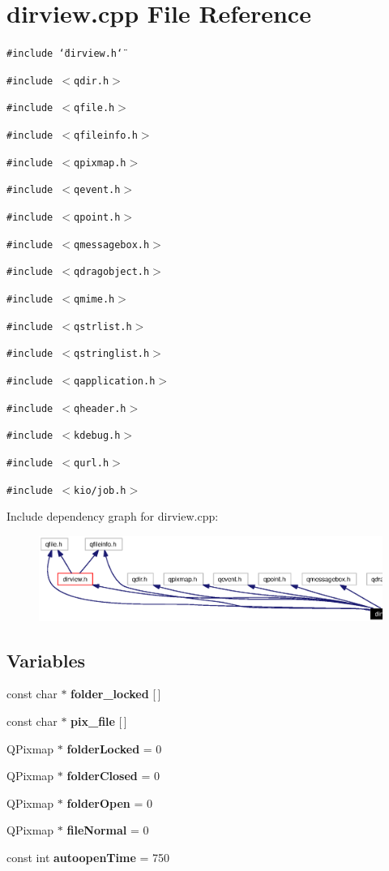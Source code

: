 \section{dirview.cpp File Reference}
\label{dirview_8cpp}


{\tt \#include \char`\"{}dirview.h\char`\"{}}\par
{\tt \#include $<$qdir.h$>$}\par
{\tt \#include $<$qfile.h$>$}\par
{\tt \#include $<$qfileinfo.h$>$}\par
{\tt \#include $<$qpixmap.h$>$}\par
{\tt \#include $<$qevent.h$>$}\par
{\tt \#include $<$qpoint.h$>$}\par
{\tt \#include $<$qmessagebox.h$>$}\par
{\tt \#include $<$qdragobject.h$>$}\par
{\tt \#include $<$qmime.h$>$}\par
{\tt \#include $<$qstrlist.h$>$}\par
{\tt \#include $<$qstringlist.h$>$}\par
{\tt \#include $<$qapplication.h$>$}\par
{\tt \#include $<$qheader.h$>$}\par
{\tt \#include $<$kdebug.h$>$}\par
{\tt \#include $<$qurl.h$>$}\par
{\tt \#include $<$kio/job.h$>$}\par


Include dependency graph for dirview.cpp:\begin{figure}[H]
\begin{center}
\leavevmode
\includegraphics[width=420pt]{dirview_8cpp__incl}
\end{center}
\end{figure}
\subsection*{Variables}
\begin{CompactItemize}
\item 
const char $\ast$ {\bf folder\_\-locked} [$\,$]
\item 
const char $\ast$ {\bf pix\_\-file} [$\,$]
\item 
QPixmap $\ast$ {\bf folder\-Locked} = 0
\item 
QPixmap $\ast$ {\bf folder\-Closed} = 0
\item 
QPixmap $\ast$ {\bf folder\-Open} = 0
\item 
QPixmap $\ast$ {\bf file\-Normal} = 0
\item 
const int {\bf autoopen\-Time} = 750
\end{CompactItemize}


